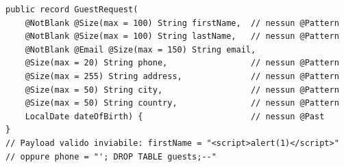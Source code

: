 ﻿\documentclass[a4paper,12pt]{report}
\begin{document}
\begin{insecurebox}[title={Codice Vulnerabile --- GuestRequest.java (baseline)}]
\begin{lstlisting}[style=java]
public record GuestRequest(
    @NotBlank @Size(max = 100) String firstName,  // nessun @Pattern
    @NotBlank @Size(max = 100) String lastName,   // nessun @Pattern
    @NotBlank @Email @Size(max = 150) String email,
    @Size(max = 20) String phone,                 // nessun @Pattern
    @Size(max = 255) String address,              // nessun @Pattern
    @Size(max = 50) String city,                  // nessun @Pattern
    @Size(max = 50) String country,               // nessun @Pattern
    LocalDate dateOfBirth) {                      // nessun @Past
}
// Payload valido inviabile: firstName = "<script>alert(1)</script>"
// oppure phone = "'; DROP TABLE guests;--"
\end{lstlisting}
\end{insecurebox}
\end{document}
